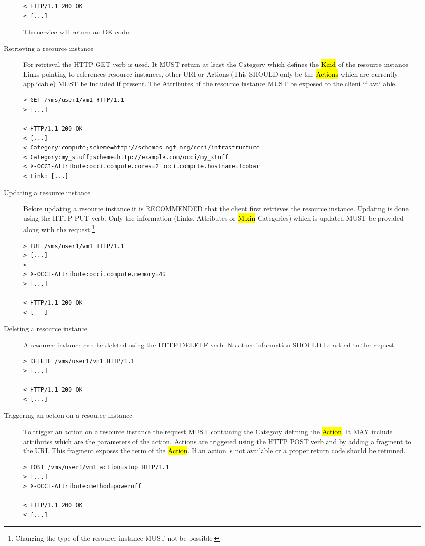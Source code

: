 \documentclass[10pt,a4paper]{article}
\begin{document}
\begin{description}
\begin{verbatim}
< HTTP/1.1 200 OK
< [...]
\end{verbatim}
  The service will return an OK code.

\item[Retrieving a resource instance] For retrieval the HTTP GET verb
  is used. It MUST return at least the Category which defines the
  \hl{Kind} of the resource instance. Links pointing to references
  resource instances, other URI or Actions (This SHOULD only be the
  \hl{Actions} which are currently applicable) MUST be included if
  present. The Attributes of the resource instance MUST be exposed to
  the client if available.
\begin{verbatim}
> GET /vms/user1/vm1 HTTP/1.1
> [...]
 
< HTTP/1.1 200 OK
< [...]
< Category:compute;scheme=http://schemas.ogf.org/occi/infrastructure
< Category:my_stuff;scheme=http://example.com/occi/my_stuff
< X-OCCI-Attribute:occi.compute.cores=2 occi.compute.hostname=foobar
< Link: [...]
\end{verbatim}

\item[Updating a resource instance] Before updating a resource
  instance it is RECOMMENDED that the client first retrieves the
  resource instance. Updating is done using the HTTP PUT verb. Only
  the information (Links, Attributes or \hl{Mixin} Categories) which
  is updated MUST be provided along with the
  request.\footnote{Changing the type of the resource instance MUST
    not be possible.}
\begin{verbatim}
> PUT /vms/user1/vm1 HTTP/1.1
> [...]
> 
> X-OCCI-Attribute:occi.compute.memory=4G
> [...]
 
< HTTP/1.1 200 OK
< [...]
\end{verbatim}

\item[Deleting a resource instance] A resource instance can be deleted
  using the HTTP DELETE verb. No other information SHOULD be added to
  the request
\begin{verbatim}
> DELETE /vms/user1/vm1 HTTP/1.1
> [...]

< HTTP/1.1 200 OK
< [...]
\end{verbatim}

\item[Triggering an action on a resource instance] To trigger an
  action on a resource instance the request MUST containing the Category
  defining the \hl{Action}. It MAY include attributes which are the
  parameters of the action. Actions are triggered using the HTTP POST
  verb and by adding a fragment to the URI. This fragment exposes the
  term of the \hl{Action}. If an action is not available or a proper
  return code should be returned.
\begin{verbatim}
> POST /vms/user1/vm1;action=stop HTTP/1.1
> [...]
> X-OCCI-Attribute:method=poweroff

< HTTP/1.1 200 OK
< [...]
\end{verbatim}
\end{description}
\end{document}
